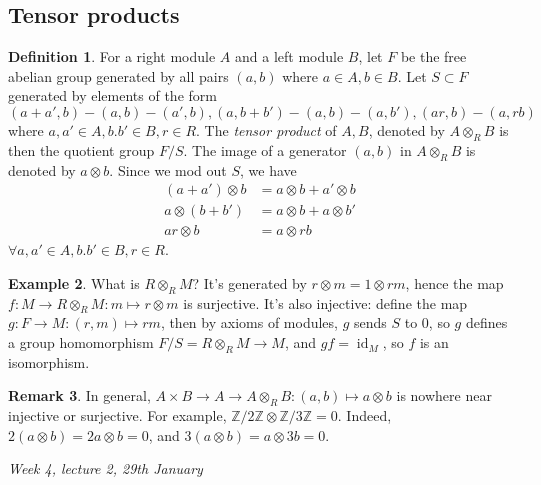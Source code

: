 \documentclass{article}
\newcommand{\Z}{\mathbb{Z}}
\newcommand{\id}{\operatorname{id}}
\theoremstyle{definition}
\newtheorem{defn}{Definition}[subsection]
\newtheorem{example}[defn]{Example}
\newtheorem{remark}[defn]{Remark}
\begin{document}
\subsection{Tensor products}
\begin{defn}
For a right module $A$ and a left module $B$, let $F$ be the free abelian group generated by all pairs $(a,b)$ where $a\in A,b\in B$. Let $S\subset F$ generated by elements of the form $(a+a',b)-(a,b)-(a',b),(a,b+b')-(a,b)-(a,b'),(ar,b)-(a,rb)$ where $a,a'\in A,b.b'\in B,r\in R$. The \textit{tensor product} of $A,B$, denoted by $A\otimes_RB$ is then the quotient group $F/S$. The image of a generator $(a,b)$ in $A\otimes_RB$ is denoted by $a\otimes b$. Since we mod out $S$, we have
\[
\begin{aligned}
(a+a')\otimes b&=a\otimes b+a'\otimes b\\
a\otimes (b+b')&=a\otimes b+a\otimes b'\\
ar\otimes b&=a\otimes rb
\end{aligned}
\]
$\forall a,a'\in A,b.b'\in B,r\in R$.
\end{defn}

\begin{example}
What is $R\otimes_RM$? It's generated by $r\otimes m=1\otimes rm$, hence the map $f:M\rightarrow R\otimes_RM:m\mapsto r\otimes m$ is surjective. It's also injective: define the map $g:F\rightarrow M:(r,m)\mapsto rm$, then by axioms of modules, $g$ sends $S$ to 0, so $g$ defines a group homomorphism $F/S=R\otimes_RM\rightarrow M$, and $gf=\id_M$, so $f$ is an isomorphism.
\end{example}

\begin{remark}
\label{remark:tensorprodeasilyvan}
In general, $A\times B\rightarrow A\rightarrow A\otimes_RB:(a,b)\mapsto a\otimes b$ is nowhere near injective or surjective. For example, $\Z/2\Z\otimes\Z/3\Z=0$. Indeed, $2(a\otimes b)=2a\otimes b=0$, and $3(a\otimes b)=a\otimes 3b=0$.
\end{remark}

\begin{flushright}
\textit{Week 4, lecture 2, 29th January}
\end{flushright}
\end{document}
